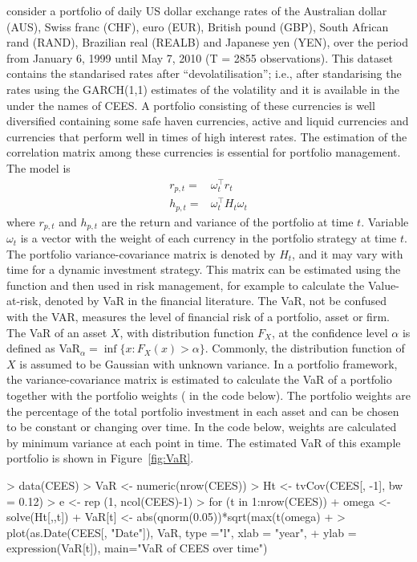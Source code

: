 \citet{AslanidisCasas2013} consider a portfolio of daily US dollar exchange rates of the Australian dollar (AUS), Swiss franc (CHF), euro (EUR), British pound (GBP), South African rand (RAND), Brazilian real (REALB) and Japanese yen (YEN), over the period from January 6, 1999 until May 7, 2010 (T = 2855 observations). This dataset contains the standarised rates after ``devolatilisation''; i.e., after standarising the rates using the GARCH(1,1) estimates of the volatility and it is available in the  under the names of CEES. A portfolio consisting of these currencies is well diversified containing some safe haven currencies, active and liquid currencies and currencies that perform well in times of high interest rates. The estimation of the correlation matrix among these currencies is essential for portfolio management. The model is
\begin{align*}
r_{p,t} = &\omega_t^\top r_t\\
h_{p,t} = &\omega_t^\top H_t \omega_t
\end{align*}
where $r_{p,t}$ and $h_{p,t}$ are the return and variance of the portfolio at time $t$. Variable $\omega_t$ is a vector with  the weight of each currency in the portfolio strategy at time $t$. The portfolio variance-covariance matrix is denoted by $H_t$, and it may vary with time for a dynamic investment strategy. This matrix can be estimated using the function  and then used in risk management, for example to calculate the Value-at-risk, denoted by VaR in the financial literature. The VaR, not be confused with the VAR, measures the level of financial risk of a portfolio, asset or firm. The VaR of an asset $X$, with distribution function $F_X$, at the confidence level $\alpha$ is defined as VaR$_\alpha = \inf\{x: F_X(x)>\alpha\}$. Commonly, the distribution function of $X$ is assumed to be Gaussian with unknown variance. In a portfolio framework, the variance-covariance matrix is estimated to calculate the VaR of a portfolio together with the portfolio weights ( in the code below). The portfolio weights are the percentage of the total portfolio investment in each asset and can be chosen to be constant or changing over time. In the code below, weights are calculated by minimum variance at each point in time. The estimated VaR of this example portfolio is shown in Figure~\ref{fig:VaR}.

\begin{Schunk}
\begin{Sinput}
> data(CEES)
> VaR <- numeric(nrow(CEES))
> Ht <- tvCov(CEES[, -1], bw = 0.12)
> e <- rep (1, ncol(CEES)-1)
> for (t in 1:nrow(CEES)){
+   omega <- solve(Ht[,,t])%
+   VaR[t] <- abs(qnorm(0.05))*sqrt(max(t(omega)%
+ }
> plot(as.Date(CEES[, "Date"]), VaR, type ="l", xlab = "year", 
+      ylab = expression(VaR[t]), main="VaR of CEES over time")
\end{Sinput}
\end{Schunk}


